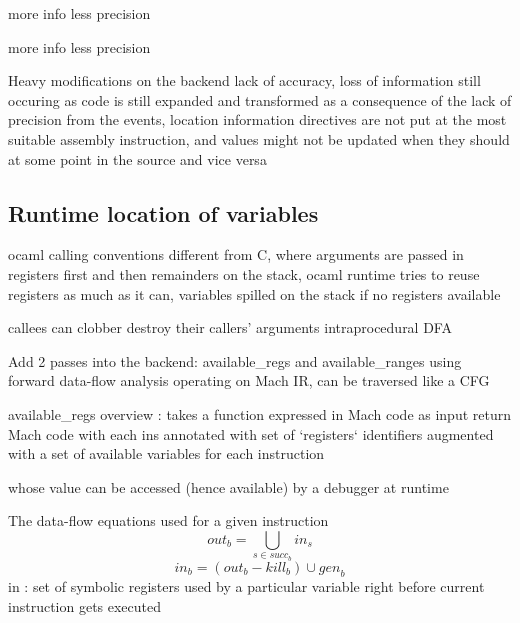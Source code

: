 \begin{description}
\pro more info
\con less precision
\end{description}

\begin{itemize}
\tick more info
\fail less precision
\end{itemize}

Heavy modifications on the backend
lack of accuracy, loss of information still occuring as code is still expanded and transformed
as a consequence of the lack of precision from the events,
location information directives are not put at the
most suitable assembly instruction, and values might not be updated when they should
at some point in the source
and vice versa

\subsection{Runtime location of variables}

ocaml calling conventions different from C, where arguments are passed in
registers first and then remainders on the stack, ocaml runtime tries to reuse registers as much as it can, variables
spilled on the stack if no registers available

callees can clobber destroy their callers' arguments
intraprocedural DFA

Add 2 passes into the backend: available\_regs and available\_ranges
using forward data-flow analysis operating on Mach IR, can be traversed like
a CFG

available\_regs overview :
takes a function expressed in Mach code as input
return Mach code with each ins annotated with set of `registers` identifiers
augmented with a set of available variables for each instruction

whose value can be accessed (hence available) by a debugger at runtime

The data-flow equations used for a given instruction
\[
    \textit{out}_{b} = \bigcup_{s \in succ_{b}} \textit{in}_{s}
\]
\[
    \textit{in}_{b} = (\textit{out}_{b} - \textit{kill}_{b}) \cup \textit{gen}_{b}
\]
in : set of symbolic registers used by a particular variable right before
current instruction gets executed

